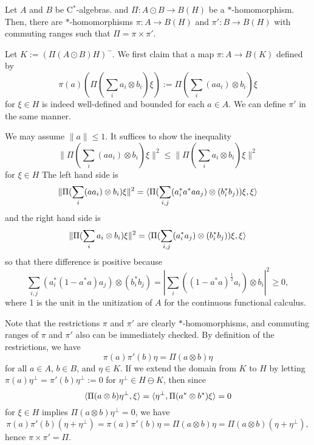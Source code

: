 \documentclass{../../../small}
\begin{document}
\begin{lem}
Let $A$ and $B$ be C$^*$-algebras. and $\Pi:A\odot B\to B(H)$ be a $*$-homomorphism.
Then, there are $*$-homomorphisms $\pi:A\to B(H)$ and $\pi': B\to B(H)$ with commuting ranges such that $\Pi=\pi\times\pi'$.
\end{lem}
\begin{pf}
Let $K:=(\Pi(A\odot B)H)^-$.
We first claim that a map $\pi:A\to B(K)$ defined by
\[\pi(a)(\Pi(\sum_ia_i\otimes b_i)\xi):=\Pi(\sum_i(aa_i)\otimes b_i)\xi\]
for $\xi\in H$ is indeed well-defined and bounded for each $a\in A$.
We can define $\pi'$ in the same manner.

We may assume $\|a\|\le1$.
It suffices to show the inequality
\[\|\Pi(\sum_i(aa_i)\otimes b_i)\xi\|^2\le\|\Pi(\sum_ia_i\otimes b_i)\xi\|^2\]
for $\xi\in H$
The left hand side is
\[\|\Pi(\sum_i(aa_i)\otimes b_i)\xi\|^2
=\langle\Pi(\sum_{i,j}(a_i^*a^*aa_j)\otimes(b_i^*b_j))\xi,\xi\rangle\]
and the right hand side is
\[\|\Pi(\sum_ia_i\otimes b_i)\xi\|^2
=\langle\Pi(\sum_{i,j}(a_i^*a_j)\otimes(b_i^*b_j))\xi,\xi\rangle\]
so that there difference is positive because
\[\sum_{i,j}(a_i^*(1-a^*a)a_j)\otimes(b_i^*b_j)=|\sum_i((1-a^*a)^{\frac12}a_i)\otimes b_i|^2\ge0,\]
where 1 is the unit in the unitization of $A$ for the continuous functional calculus.

Note that the restrictions $\pi$ and $\pi'$ are clearly $*$-homomorphisms, and commuting ranges of $\pi$ and $\pi'$ also can be immediately checked.
By definition of the restrictions, we have
\[\pi(a)\pi'(b)\eta=\Pi(a\otimes b)\eta\]
for all $a\in A$, $b\in B$, and $\eta\in K$.
If we extend the domain from $K$ to $H$ by letting $\pi(a)\eta^\perp=\pi'(b)\eta^\perp:=0$ for $\eta^\perp\in H\ominus K$, then since
\[\langle\Pi(a\otimes b)\eta^\perp,\xi\rangle=\langle\eta^\perp,\Pi(a^*\otimes b^*)\xi\rangle=0\]
for $\xi\in H$ implies $\Pi(a\otimes b)\eta^\perp=0$, we have
\[\pi(a)\pi'(b)(\eta+\eta^\perp)=\pi(a)\pi'(b)\eta=\Pi(a\otimes b)\eta=\Pi(a\otimes b)(\eta+\eta^\perp),\]
hence $\pi\times\pi'=\Pi$.
\end{pf}
\end{document}
